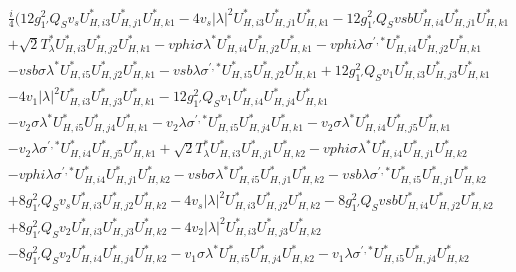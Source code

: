 \begin{align} 
 &\frac{i}{4} \Big(12 g_{1'}^{2} Q_{S} v_s U^*_{{H},{i 3}} U^*_{{H},{j 1}} U^*_{{H},{k 1}} -4 v_s |\lambda|^2 U^*_{{H},{i 3}} U^*_{{H},{j 1}} U^*_{{H},{k 1}} -12 g_{1'}^{2} Q_{S} vsb U^*_{{H},{i 4}} U^*_{{H},{j 1}} U^*_{{H},{k 1}} \nonumber \\ 
 &+\sqrt{2} T_{\lambda}^* U^*_{{H},{i 3}} U^*_{{H},{j 2}} U^*_{{H},{k 1}} - vphi \sigma \lambda^* U^*_{{H},{i 4}} U^*_{{H},{j 2}} U^*_{{H},{k 1}} - vphi \lambda \sigma^{\prime,*} U^*_{{H},{i 4}} U^*_{{H},{j 2}} U^*_{{H},{k 1}} \nonumber \\ 
 &- vsb \sigma \lambda^* U^*_{{H},{i 5}} U^*_{{H},{j 2}} U^*_{{H},{k 1}} - vsb \lambda \sigma^{\prime,*} U^*_{{H},{i 5}} U^*_{{H},{j 2}} U^*_{{H},{k 1}} +12 g_{1'}^{2} Q_{S} v_1 U^*_{{H},{i 3}} U^*_{{H},{j 3}} U^*_{{H},{k 1}} \nonumber \\ 
 &-4 v_1 |\lambda|^2 U^*_{{H},{i 3}} U^*_{{H},{j 3}} U^*_{{H},{k 1}} -12 g_{1'}^{2} Q_{S} v_1 U^*_{{H},{i 4}} U^*_{{H},{j 4}} U^*_{{H},{k 1}} \nonumber \\ 
 &- v_2 \sigma \lambda^* U^*_{{H},{i 5}} U^*_{{H},{j 4}} U^*_{{H},{k 1}} - v_2 \lambda \sigma^{\prime,*} U^*_{{H},{i 5}} U^*_{{H},{j 4}} U^*_{{H},{k 1}} - v_2 \sigma \lambda^* U^*_{{H},{i 4}} U^*_{{H},{j 5}} U^*_{{H},{k 1}} \nonumber \\ 
 &- v_2 \lambda \sigma^{\prime,*} U^*_{{H},{i 4}} U^*_{{H},{j 5}} U^*_{{H},{k 1}} +\sqrt{2} T_{\lambda}^* U^*_{{H},{i 3}} U^*_{{H},{j 1}} U^*_{{H},{k 2}} - vphi \sigma \lambda^* U^*_{{H},{i 4}} U^*_{{H},{j 1}} U^*_{{H},{k 2}} \nonumber \\ 
 &- vphi \lambda \sigma^{\prime,*} U^*_{{H},{i 4}} U^*_{{H},{j 1}} U^*_{{H},{k 2}} - vsb \sigma \lambda^* U^*_{{H},{i 5}} U^*_{{H},{j 1}} U^*_{{H},{k 2}} - vsb \lambda \sigma^{\prime,*} U^*_{{H},{i 5}} U^*_{{H},{j 1}} U^*_{{H},{k 2}} \nonumber \\ 
 &+8 g_{1'}^{2} Q_{S} v_s U^*_{{H},{i 3}} U^*_{{H},{j 2}} U^*_{{H},{k 2}} -4 v_s |\lambda|^2 U^*_{{H},{i 3}} U^*_{{H},{j 2}} U^*_{{H},{k 2}} -8 g_{1'}^{2} Q_{S} vsb U^*_{{H},{i 4}} U^*_{{H},{j 2}} U^*_{{H},{k 2}} \nonumber \\ 
 &+8 g_{1'}^{2} Q_{S} v_2 U^*_{{H},{i 3}} U^*_{{H},{j 3}} U^*_{{H},{k 2}} -4 v_2 |\lambda|^2 U^*_{{H},{i 3}} U^*_{{H},{j 3}} U^*_{{H},{k 2}} \nonumber \\ 
 &-8 g_{1'}^{2} Q_{S} v_2 U^*_{{H},{i 4}} U^*_{{H},{j 4}} U^*_{{H},{k 2}} - v_1 \sigma \lambda^* U^*_{{H},{i 5}} U^*_{{H},{j 4}} U^*_{{H},{k 2}} - v_1 \lambda \sigma^{\prime,*} U^*_{{H},{i 5}} U^*_{{H},{j 4}} U^*_{{H},{k 2}} \nonumber \\ 

\end{align}
